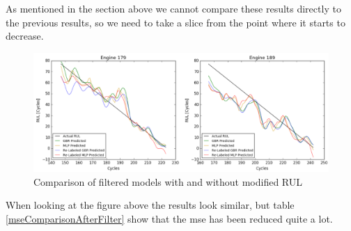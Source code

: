 \documentclass[english, a4paper]{report}
\begin{document}
{{{{                As mentioned in the section above we cannot compare these results directly to the previous results, so we need to take a slice from the point where it starts to decrease. 
                
                \begin{figure}[H]
                    \centering \includegraphics[width=1\linewidth]{comparisonAfterFilter}
                    \caption{Comparison of filtered models with and without modified RUL}
                    \label{fig:comparisonAfterFilter}
                \end{figure}
                
                When looking at the figure above the results look similar, but table \ref{mseComparisonAfterFilter} show that the \gls{mse} has been reduced quite a lot. 
                
}}}}
\end{document}
